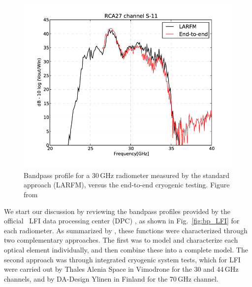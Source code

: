 \documentclass[twocolumn]{aa}
\newcommand{\?}[1]{\textcolor{red}{{\bf [#1]}}}
\begin{document}
\begin{figure}[t] %
  \center
  \includegraphics[trim=50 40 60 30, clip=True, width=\linewidth]{figs/LFI27S-11-at-30-GHz-Comparison-of-LARFM-bandpasses-with-end-to-end-swept-source.png}
  \caption{Bandpass profile for a 30\,GHz radiometer measured by the standard
  approach (LARFM), versus the end-to-end cryogenic testing. Figure from \citet{zonca2009}}
  \label{fig:check}
\end{figure}

We start our discussion by reviewing the bandpass profiles provided by the
official \Planck\ LFI data processing center (DPC) \citep{planck2013-p02}, as
shown in Fig.~\ref{fig:bp_LFI} for each radiometer. As summarized by
\citet{zonca2009}, these functions were characterized through two complementary
approaches. The first was to model and characterize each optical element
individually, and then combine these into a complete model. The second approach
was through integrated cryogenic system tests, which for LFI were carried out by
Thales Alenia Space in Vimodrone for the 30 and 44\,GHz channels, and by
DA-Design Ylinen in Finland for the 70\,GHz channel.
\end{document}
